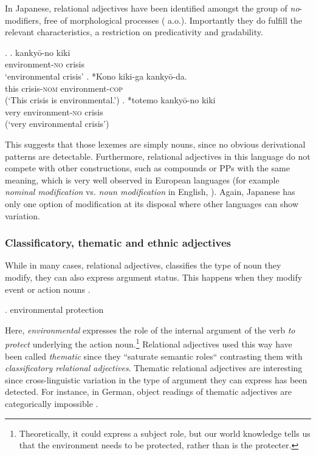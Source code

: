 \documentclass [output=book,colorlinks,citecolor=brown]{langscibook}
\begin{document}
In Japanese, relational adjectives have been identified amongst the group of \textit{no}-modifiers, free of morphological processes (\citealt{bisetto:2010:RA, nagano:2016:are} a.o.). Importantly they do fulfill the relevant characteristics, a restriction on predicativity and gradability.

\ex. \ag. kankyō-no kiki \\
environment-\textsc{no} crisis\\
`environmental crisis’
\bg. *Kono kiki-ga kankyō-da.\\
this crisis-\textsc{nom} environment-\textsc{cop}\\
(`This crisis is environmental.’)
\cg. *totemo kankyō-no kiki \\
very environment-\textsc{no} crisis\\
(`very environmental crisis’)

This suggests that those lexemes are simply nouns, since no obvious derivational patterns are detectable. Furthermore, relational adjectives in this language do not compete with other constructions, such as compounds or PPs with the same meaning, which is very well observed in European languages (for example \textit{nominal modification} vs. \textit{noun modification} in English, \citealt{hacken:2013:compounds, rainer:2013:can, nikolaeva:2020:mixed}). Again, Japanese has only one option of modification at its disposal where other languages can show variation.

\subsubsection{Classificatory, thematic and ethnic adjectives}

While in many cases, relational adjectives, classifies the type of noun they modify, they can also express argument status. This happens when they modify event or action nouns \citep{grimshaw:1991:argument}.

\ex. environmental protection

Here, \textit{environmental} expresses the role of the internal argument of the verb \textit{to protect} underlying the action noun.\footnote{Theoretically, it could express a subject role, but our world knowledge tells us that the environment needs to be protected, rather than is the protecter.} Relational adjectives used this way have been called \textit{thematic} since they ``saturate semantic roles“ \citep[360]{bosque:1996:postnominal} contrasting them with \textit{classificatory relational adjectives}. Thematic relational adjectives are interesting since cross-linguistic variation in the type of argument they can express has been detected. For instance, in German, object readings of thematic adjectives are categorically impossible \citep{gunkel:2008:constraints}. %
\end{document}
